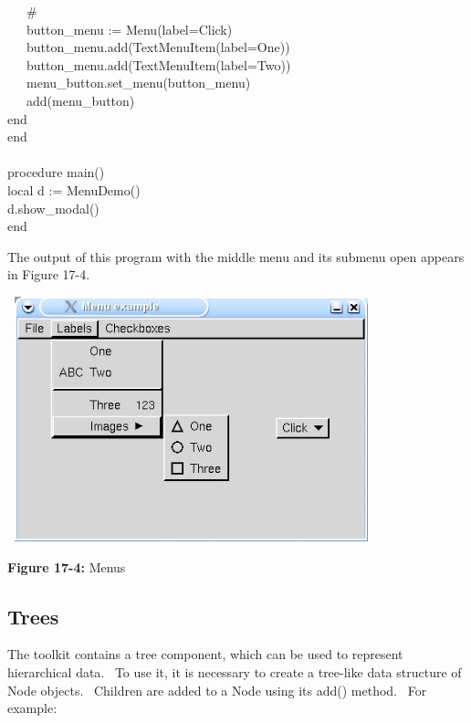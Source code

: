 {\>   \ \ \ \# \\
\>   \ \ \ button\_menu :=
Menu({\textquotedbl}label=Click{\textquotedbl}) \\
\>   \ \ \ button\_menu.add(TextMenuItem({\textquotedbl}label=One{\textquotedbl})) \\
\>   \ \ \ button\_menu.add(TextMenuItem({\textquotedbl}label=Two{\textquotedbl})) \\
\>   \ \ \ menu\_button.set\_menu(button\_menu) \\
\>   \ \ \ add(menu\_button) \\
\>   end \\
end \\
\ \\
procedure main() \\
\>   local d := MenuDemo() \\
\>   d.show\_modal() \\
end
}


\bigskip

The output of this program with the middle menu and its submenu open
appears in Figure 17-4.\\

\begin{center}
\includegraphics[width=4.2043in,height=2.7925in]{ub-img/ub-img53.jpg}
\end{center}

{\sffamily\bfseries Figure 17-4:}
{\sffamily Menus}

\subsection{Trees}
The toolkit contains a tree component, which can be used to represent
hierarchical data. \ To use it, it is necessary to create a tree-like
data structure of \textsf{Node} objects. \ Children are added to a
\textsf{Node} using its \textsf{add()} method. \ For example:

